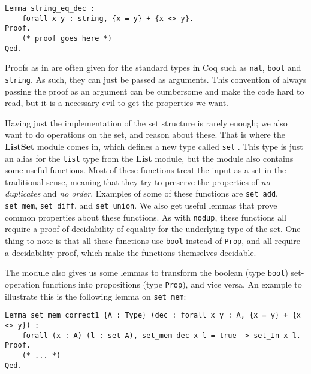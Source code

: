\begin{minipage}{\linewidth}
\begin{lstlisting}[language=Coq, label={lst:string_eq_dec}, caption={Decidability proof for string equality in Coq}]
Lemma string_eq_dec :
    forall x y : string, {x = y} + {x <> y}.
Proof.
    (* proof goes here *)
Qed.
\end{lstlisting}
\end{minipage}

Proofs as in  are often given for the standard types in Coq such as \lstinline{nat},
\lstinline{bool} and \lstinline{string}.
As such, they can just be passed as arguments.
This convention of always passing the proof as an argument can be cumbersome and make the code hard to read,
but it is a necessary evil to get the properties we want.

Having just the implementation of the set structure is rarely enough; we also want to do operations on the set, and reason about these.
That is where the \textbf{ListSet} module comes in, which defines a new type called \lstinline{set} \cite{coqlistset}.
This type is just an alias for the \lstinline{list} type from the \textbf{List} module,
but the module also contains some useful functions.
Most of these functions treat the input as a set in the traditional sense,
meaning that they try to preserve the properties of \textit{no duplicates} and \textit{no order}.
Examples of some of these functions are \lstinline{set_add}, \lstinline{set_mem},
\lstinline{set_diff}, and \lstinline{set_union}.
We also get useful lemmas that prove common properties about these functions.
As with \lstinline{nodup}, these functions all require a proof of decidability of equality for the underlying type of the set.
One thing to note is that all these functions use \lstinline{bool} instead of
\lstinline{Prop}, and all require a decidability proof, which make the functions themselves decidable.

The module also gives us some lemmas to transform the boolean (type \lstinline{bool}) set-operation functions into
propositions (type \lstinline{Prop}), and vice versa. An example to illustrate this is the following lemma on \lstinline{set_mem}:

\begin{minipage}{\linewidth}
\begin{lstlisting}[language=Coq, label={lst:set_mem_correct1}, caption={\lstinline{set_mem} lemma in \lstinline{ListSet} module}]
Lemma set_mem_correct1 {A : Type} (dec : forall x y : A, {x = y} + {x <> y}) :
    forall (x : A) (l : set A), set_mem dec x l = true -> set_In x l.
Proof.
    (* ... *)
Qed.
\end{lstlisting}
\end{minipage}

